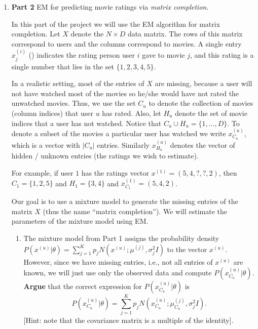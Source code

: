 \begin{enumerate}
\begin{enumerate}
\end{enumerate}

\item {\bf Part 2} EM for predicting movie ratings via \emph{matrix completion}.

In this part of the project we will use the EM algorithm for matrix completion. Let $X$ denote the $N \times D$ data matrix. The rows of this matrix correspond to users and the columns correspond to movies. A single entry $x^{(i)}_{j}$ () indicates the rating person user $i$ gave to movie $j$, and this rating is a single number that lies in the set $\{1,2,3,4,5\}$. 

In a realistic setting, most of the entries of $X$ are missing, because a user will not have watched most of the movies so he/she would have not rated the unwatched movies. Thus, we use the set $C_{u}$ to denote the collection of movies (column indices) that user $u$ has rated. Also, let $H_{u}$ denote the set of movie indices that a user has not watched. Notice that $C_{u} \cup H_{u} = \{1,\ldots,D\}$. To denote a subset of the movies a particular user has watched we write $x_{C_u}^{(u)}$, which is a vector with $|C_u|$ entries. Similarly $x_{H_u}^{(u)}$ denotes the vector of hidden / unknown entries (the ratings we wish to estimate).

For example, if user $1$ has the ratings vector $x^{(1)} =  (5, 4, ?, ?, 2)$, then $C_{1} = \{1, 2, 5\}$ and $H_{1} = \{ 3, 4\}$ and $x^{(1)}_{C_1} = (5, 4, 2)$.

Our goal is to use a mixture model to generate the missing entries of the matrix $X$ (thus the name ``matrix completion''). We will estimate the parameters of the mixture model using EM.

\begin{enumerate}
\item The mixture model from Part 1 assigns the probability density $P(x^{(u)} | \theta) = \sum^{K}_{j=1} p_j N(x^{(u)}; \mu^{(j)}, \sigma^2_j I)$ to the vector $x^{(u)}$. However, since we have missing entries, i.e., not all entries of $x^{(u)}$ are known, we will just use only the observed data and compute $P(x^{(u)}_{C_u} | \theta)$. \textbf{Argue} that the correct expression for $P(x^{(u)}_{C_u}  | \theta)$ is
 $$P(x^{(u)}_{C_u}  | \theta) = \sum^{K}_{j=1} p_j N(x^{(u)}_{C_u} ; \mu^{(j)}_{C_u} , \sigma^2_j I).$$ [Hint: note that the covariance matrix is a multiple of the identity].


\end{enumerate}
\end{enumerate}
